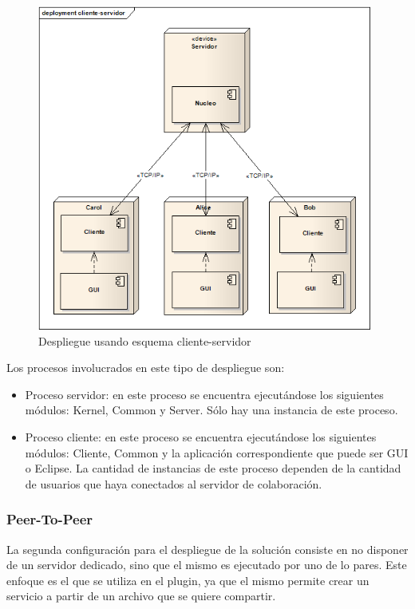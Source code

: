 \documentclass[12pt,a4paper]{article}
\begin{document}
	\begin{figure}[!ht]
		\begin{center}
			\includegraphics[width=11cm]{cliente-servidor.png}
			\caption{\label{cliente-servidor} Despliegue usando esquema cliente-servidor }
		\end{center}
	\end{figure}

Los procesos involucrados en este tipo de despliegue son:

\begin{itemize}
	\item Proceso servidor: en este proceso se encuentra ejecutándose los siguientes módulos: Kernel, Common y Server. Sólo
	hay una instancia de este proceso.
	\item Proceso cliente: en este proceso se encuentra ejecutándose los siguientes módulos: Cliente, Common y la aplicación
	correspondiente que puede ser GUI o Eclipse. La cantidad de instancias de este proceso dependen de la cantidad de usuarios que
	haya conectados al servidor de colaboración.
\end{itemize}

\subsubsection{Peer-To-Peer}
La segunda configuración para el despliegue de la solución consiste en no disponer de un servidor dedicado, sino que el
mismo es ejecutado por uno de lo pares. Este enfoque es el que se utiliza en el plugin, ya que el mismo permite crear un servicio
a partir de un archivo que se quiere compartir.
\end{document}
